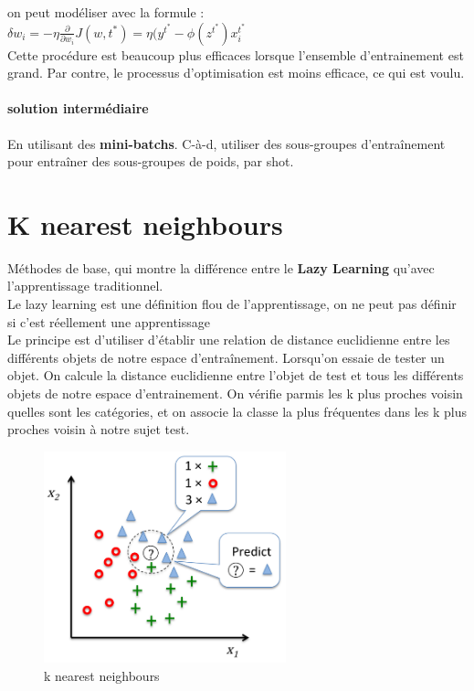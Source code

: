 \documentclass[oneside]{book}
\begin{document}
on peut modéliser avec la formule :\\

\centering
$\delta w_i = - \eta \frac{\partial}{\partial w_i}J(w, t^*) = \eta (y^{t^*} - \phi(z^{t^*})x_i^{t^*}$\\

\justify
Cette procédure est beaucoup plus efficaces lorsque l'ensemble d'entrainement est grand. Par contre, le processus d'optimisation est moins efficace, ce qui est voulu. \\

\paragraph{solution intermédiaire} En utilisant des \textbf{mini-batchs}. C-à-d, utiliser des sous-groupes d'entraînement pour entraîner des sous-groupes de poids, par shot.\\

\section{K nearest neighbours}
Méthodes de base, qui montre la différence entre le \textbf{Lazy Learning} qu'avec l'apprentissage traditionnel. \\

Le lazy learning est une définition flou de l'apprentissage, on ne peut pas définir si c'est réellement une apprentissage\\

Le principe est d'utiliser d'établir une relation de distance euclidienne entre les différents objets de notre espace d'entraînement. Lorsqu'on essaie de tester un objet. On calcule la distance euclidienne entre l'objet de test et tous les différents objets de notre espace d'entrainement. On vérifie parmis les k plus proches voisin quelles sont les catégories, et on associe la classe la plus fréquentes dans les k plus proches voisin à notre sujet test. \\

\begin{figure}[!ht]
\centering
\includegraphics[width = 7cm, keepaspectratio]{Kcluster.png}
\caption{k nearest neighbours}
\label{fig:knn}
\end{figure}
\end{document}
